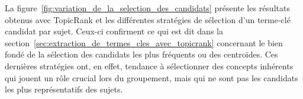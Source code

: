     La figure~\ref{fig:variation_de_la_selection_des_candidats} présente les
    résultats obtenus avec TopicRank et les différentes stratégies de sélection
    d'un terme-clé candidat par sujet. Ceux-ci confirment ce qui est dit dans la
    section~\ref{sec:extraction_de_termes_cles_avec_topicrank} concernant le
    bien fondé de la sélection des candidats les plus fréquents ou des
    centroïdes. Ces dernières stratégies ont, en effet, tendance à sélectionner
    des concepts inhérents qui jouent un rôle crucial lors du groupement, mais
    qui ne sont pas les candidats les plus représentatifs des sujets.
